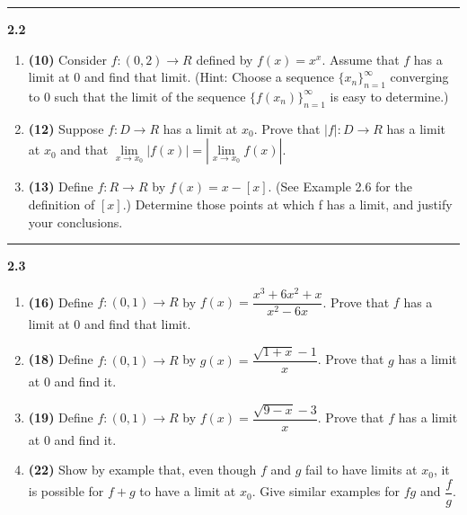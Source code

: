 \documentclass[fleqn]{article}
\begin{document}
  \rule{15cm}{2pt}

  \textbf{2.2}
  \begin{enumerate}
    \item \textbf{(10)} Consider $f: (0,2) \longrightarrow R$ defined by $f(x)=x^x$. Assume that $f$ has a limit at $0$ and find that limit.
    (Hint: Choose a sequence $\{x_n\}_{n=1}^{\infty}$ converging to $0$ such that the limit of the
    sequence $\{f(x_n)\}_{n=1}^{\infty}$ is easy to determine.)

        


    \item \textbf{(12)} Suppose $f: D \longrightarrow R$ has a limit at $x_0$. Prove that $|f|: D \longrightarrow R$ has 
    a limit at $x_0$ and that $\lim\limits_{x \to x_0} |f(x)|=|\lim\limits_{x \to x_0} f(x)|$.

        


    \item \textbf{(13)} Define $f: R \longrightarrow R$ by $f(x)=x-[x]$. (See Example 2.6 for the definition 
    of $[x]$.) Determine those points at which f has a limit, and justify your conclusions.

        

  \end{enumerate}

  \rule{15cm}{2pt}

  \textbf{2.3}
  \begin{enumerate}
    \item \textbf{(16)} Define $f: (0, 1) \longrightarrow R$ by $f(x)=\dfrac{x^3+6x^2+x}{x^2-6x}$. Prove that $f$ 
    has a limit at $0$ and find that limit. 

        


    \item \textbf{(18)} Define $f: (0, 1) \longrightarrow R$ by $g(x)=\dfrac{\sqrt{1+x}-1}{x}$. Prove that $g$ has a limit
    at $0$ and find it.

        


    \item \textbf{(19)} Define $f: (0, 1) \longrightarrow R$ by $f(x)=\dfrac{\sqrt{9-x}-3}{x}$. Prove that $f$ has a limit 
    at $0$ and find it.

        


    \item \textbf{(22)} Show by example that, even though $f$ and $g$ fail to have limits at $x_0$, it is possible for
    $f+g$ to have a limit at $x_0$. Give similar examples for $fg$ and $\dfrac{f}{g}$.

        


  \end{enumerate}
\end{document}
